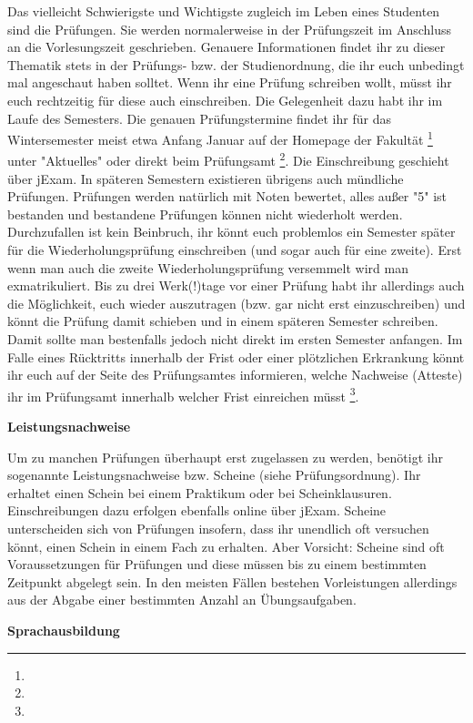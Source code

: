 Das vielleicht Schwierigste und Wichtigste zugleich im Leben eines Studenten sind die Prüfungen.
Sie werden normalerweise in der Prüfungszeit im Anschluss an die Vorlesungszeit geschrieben.
Genauere Informationen findet ihr zu dieser Thematik stets in der Prüfungs- bzw. der Studienordnung, die ihr euch unbedingt mal angeschaut haben solltet.
Wenn ihr eine Prüfung schreiben wollt, müsst ihr euch rechtzeitig für diese auch einschreiben.
Die Gelegenheit dazu habt ihr im Laufe des Semesters.
Die genauen Prüfungstermine findet ihr für das Wintersemester meist etwa Anfang Januar auf der Homepage der Fakultät \footnote{} unter "Aktuelles" oder direkt beim Prüfungsamt \footnote{}.
Die Einschreibung geschieht über jExam.
In späteren Semestern existieren übrigens auch mündliche Prüfungen.
Prüfungen werden natürlich mit Noten bewertet, alles außer "5" ist bestanden und bestandene Prüfungen können nicht wiederholt werden.
Durchzufallen ist kein Beinbruch, ihr könnt euch problemlos ein Semester später für die Wiederholungsprüfung einschreiben (und sogar auch für eine zweite).
Erst wenn man auch die zweite Wiederholungsprüfung versemmelt wird man exmatrikuliert.
Bis zu drei Werk(!)tage vor einer Prüfung habt ihr allerdings auch die Möglichkeit, euch wieder auszutragen (bzw. gar nicht erst einzuschreiben) und könnt die Prüfung damit schieben und in einem späteren Semester schreiben.
Damit sollte man bestenfalls jedoch nicht direkt im ersten Semester anfangen.
Im Falle eines Rücktritts innerhalb der Frist oder einer plötzlichen Erkrankung könnt ihr euch auf der Seite des Prüfungsamtes informieren, welche Nachweise (Atteste) ihr im Prüfungsamt innerhalb welcher Frist einreichen müsst \footnote{}.

\textbf{Leistungsnachweise}

Um zu manchen Prüfungen überhaupt erst zugelassen zu werden, benötigt ihr sogenannte Leistungsnachweise bzw. Scheine (siehe Prüfungsordnung).
Ihr erhaltet einen Schein bei einem Praktikum oder bei Scheinklausuren.
Einschreibungen dazu erfolgen ebenfalls online über jExam.
Scheine unterscheiden sich von Prüfungen insofern, dass ihr unendlich oft versuchen könnt, einen Schein in einem Fach zu erhalten.
Aber Vorsicht: Scheine sind oft Voraussetzungen für Prüfungen und diese müssen bis zu einem bestimmten Zeitpunkt abgelegt sein.
In den meisten Fällen bestehen Vorleistungen allerdings aus der Abgabe einer bestimmten Anzahl an Übungsaufgaben.

\textbf{Sprachausbildung}

